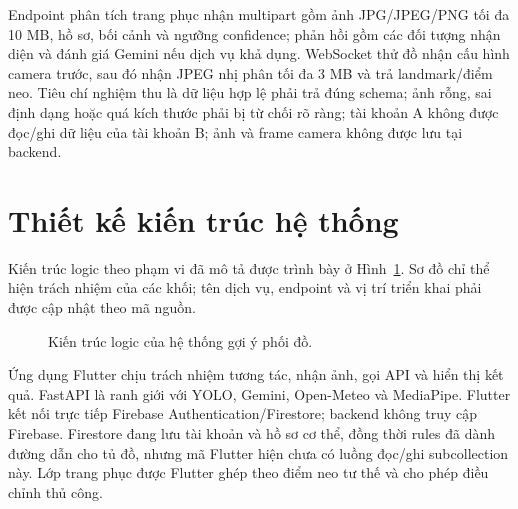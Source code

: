 Endpoint phân tích trang phục nhận multipart gồm ảnh JPG/JPEG/PNG tối đa
10 MB, hồ sơ, bối cảnh và ngưỡng confidence; phản hồi gồm các đối tượng
nhận diện và đánh giá Gemini nếu dịch vụ khả dụng. WebSocket thử đồ nhận cấu
hình camera trước, sau đó nhận JPEG nhị phân tối đa 3 MB và trả landmark/điểm
neo. Tiêu chí nghiệm thu là dữ liệu hợp lệ phải trả đúng schema; ảnh rỗng, sai
định dạng hoặc quá kích thước phải bị từ chối rõ ràng; tài khoản A không được
đọc/ghi dữ liệu của tài khoản B; ảnh và frame camera không được lưu tại backend.

\section{Thiết kế kiến trúc hệ thống}

Kiến trúc logic theo phạm vi đã mô tả được trình bày ở
Hình~\ref{fig:kientruc}. Sơ đồ chỉ thể hiện trách nhiệm của các khối; tên
dịch vụ, endpoint và vị trí triển khai phải được cập nhật theo mã nguồn.

\begin{figure}[H]
\centering
{}
\caption{Kiến trúc logic của hệ thống gợi ý phối đồ.}
\label{fig:kientruc}
\end{figure}

Ứng dụng Flutter chịu trách nhiệm tương tác, nhận ảnh, gọi API và hiển thị
kết quả. FastAPI là ranh giới với YOLO, Gemini, Open-Meteo và MediaPipe.
Flutter kết nối trực tiếp Firebase Authentication/Firestore; backend không
truy cập Firebase. Firestore đang lưu tài khoản và hồ sơ cơ thể, đồng thời
rules đã dành đường dẫn  cho tủ đồ,
nhưng mã Flutter hiện chưa có luồng đọc/ghi subcollection này. Lớp trang phục
được Flutter ghép theo điểm neo tư thế và cho phép điều chỉnh thủ công.

